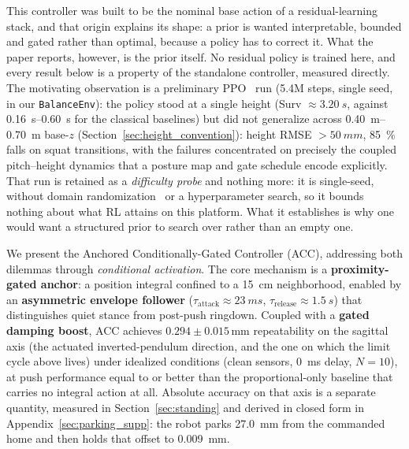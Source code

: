 \documentclass[a4paper,fleqn]{cas-dc}
\begin{document}
This controller was built to be the nominal base action of a residual-learning stack, and that origin explains its shape: a prior is wanted interpretable, bounded and gated rather than optimal, because a policy has to correct it. What the paper reports, however, is the prior itself. No residual policy is trained here, and every result below is a property of the standalone controller, measured directly. The motivating observation is a preliminary PPO~\cite{schulman2017ppo} run (5.4M steps, single seed, in our \texttt{BalanceEnv}): the policy stood at a single height (Surv ${\approx}\SI{3.20}{s}$, against \SIrange{0.16}{0.60}{s} for the classical baselines) but did not generalize across \SIrange{0.40}{0.70}{m} base-$z$ (Section~\ref{sec:height_convention}): height RMSE ${>}\SI{50}{mm}$, \SI{85}{\percent} falls on squat transitions, with the failures concentrated on precisely the coupled pitch--height dynamics that a posture map and gate schedule encode explicitly. That run is retained as a \emph{difficulty probe} and nothing more: it is single-seed, without domain randomization~\cite{tobin2017domainrand,peng2018dynrand} or a hyperparameter search, so it bounds nothing about what RL attains on this platform. What it establishes is why one would want a structured prior to search over rather than an empty one.

We present the Anchored Conditionally-Gated Controller (ACC), addressing both dilemmas through \emph{conditional activation}.
The core mechanism is a \textbf{proximity-gated anchor}: a position integral confined to a \SI{15}{cm} neighborhood, enabled by an \textbf{asymmetric envelope follower} ($\tau_{\text{attack}}{\approx}\SI{23}{ms}$, $\tau_{\text{release}}{\approx}\SI{1.5}{s}$) that distinguishes quiet stance from post-push ringdown.
Coupled with a \textbf{gated damping boost}, ACC achieves $0.294{\pm}0.015$\,mm repeatability on the sagittal axis (the actuated inverted-pendulum direction, and the one on which the limit cycle above lives) under idealized conditions (clean sensors, \SI{0}{ms} delay, $N{=}10$), at push performance equal to or better than the proportional-only baseline that carries no integral action at all. Absolute accuracy on that axis is a separate quantity, measured in Section~\ref{sec:standing} and derived in closed form in Appendix~\ref{sec:parking_supp}: the robot parks \SI{27.0}{mm} from the commanded home and then holds that offset to \SI{0.009}{mm}.
\end{document}
